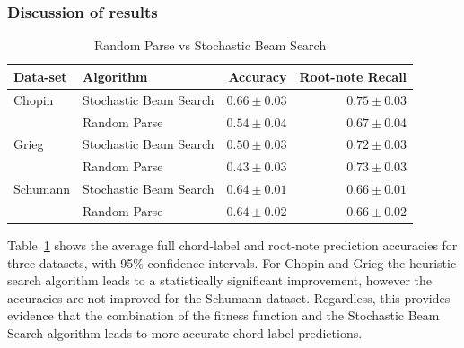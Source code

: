 \documentclass[12pt,a4paper,twoside,openany]{report} \usepackage[pdfborder={0 0 0}]{hyperref}    %
\theoremstyle{definition} \newtheorem{definition}{Definition}[section]
\begin{document}

  \subsubsection{Discussion of results}
\begin{table}[ht!] 
\caption{Random Parse vs Stochastic Beam Search} 
\label{tab:heursticRed} 
\centering
\begin{tabular}{llrr}
\toprule
 Data-set &  Algorithm                            &         Accuracy &      Root-note Recall \\
\midrule
 Chopin &  Stochastic Beam Search &  $\bm{0.66 \pm 0.03}$ &  $\bm{0.75 \pm 0.03}$ \\
         & Random Parse &  $0.54 \pm 0.04$ &  $0.67 \pm 0.04$ \\
 Grieg & Stochastic Beam Search &  $\bm{0.50 \pm 0.03}$ &  $\bm{0.72 \pm 0.03}$ \\
         &   Random Parse &  $0.43 \pm 0.03$ &  $0.73 \pm 0.03$ \\
Schumann & Stochastic Beam Search &  $0.64 \pm 0.01$ &  $0.66 \pm 0.01$ \\
         & Random Parse &  $0.64 \pm 0.02$ &  $0.66 \pm 0.02$ \\
\bottomrule
\end{tabular}
\end{table}

Table~\ref{tab:heursticRed} shows the average full chord-label and root-note prediction accuracies for three
datasets, with 95\% confidence intervals. For Chopin and Grieg the heuristic search algorithm leads to a statistically
significant improvement, however the accuracies are not improved for the Schumann dataset. Regardless, this provides
evidence that the combination of the fitness function and the Stochastic Beam Search algorithm leads to more accurate
chord label predictions. 
\end{document}
